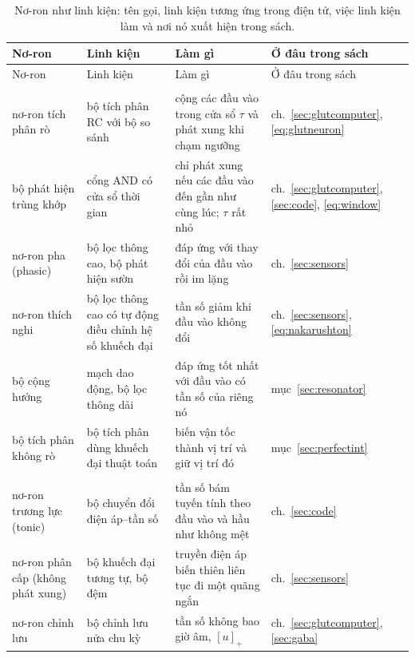 \begin{center}
\footnotesize
\setlength{\tabcolsep}{3pt}
\renewcommand{\arraystretch}{1.15}
\begin{longtable}{>{\raggedright}p{3.1cm}>{\raggedright}p{3.3cm}>{\raggedright}p{4.7cm}>{\raggedright\arraybackslash}p{2.4cm}}
\caption{Nơ-ron như linh kiện: tên gọi, linh kiện tương ứng trong điện tử, việc linh kiện làm và nơi nó xuất hiện trong sách.}\label{tab:eetypes}\\
\toprule
Nơ-ron & Linh kiện & Làm gì & Ở đâu trong sách \\
\midrule
\endfirsthead
\toprule
Nơ-ron & Linh kiện & Làm gì & Ở đâu trong sách \\
\midrule
\endhead
\bottomrule
\endfoot
\multicolumn{4}{l}{\emph{Bộ lọc và bộ tích phân}} \\
nơ-ron tích phân rò & bộ tích phân RC với bộ so sánh & cộng các đầu vào trong cửa sổ $\tau$ và phát xung khi chạm ngưỡng & ch.~\ref{sec:glutcomputer}, \eqref{eq:glutneuron} \\
bộ phát hiện trùng khớp & cổng AND có cửa sổ thời gian & chỉ phát xung nếu các đầu vào đến gần như cùng lúc; $\tau$ rất nhỏ & ch.~\ref{sec:glutcomputer}, \ref{sec:code}, \eqref{eq:window} \\
nơ-ron pha (phasic) & bộ lọc thông cao, bộ phát hiện sườn & đáp ứng với thay đổi của đầu vào rồi im lặng & ch.~\ref{sec:sensors} \\
nơ-ron thích nghi & bộ lọc thông cao có tự động điều chỉnh hệ số khuếch đại & tần số giảm khi đầu vào không đổi & ch.~\ref{sec:sensors}, \eqref{eq:nakarushton} \\
bộ cộng hưởng & mạch dao động, bộ lọc thông dải & đáp ứng tốt nhất với đầu vào có tần số của riêng nó & mục~\ref{sec:resonator} \\
bộ tích phân không rò & bộ tích phân dùng khuếch đại thuật toán & biến vận tốc thành vị trí và giữ vị trí đó & mục~\ref{sec:perfectint} \\
\midrule
\multicolumn{4}{l}{\emph{Bộ chuyển đổi}} \\
nơ-ron trương lực (tonic) & bộ chuyển đổi điện áp--tần số & tần số bám tuyến tính theo đầu vào và hầu như không mệt & ch.~\ref{sec:code} \\
nơ-ron phân cấp (không phát xung) & bộ khuếch đại tương tự, bộ đệm & truyền điện áp biến thiên liên tục đi một quãng ngắn & ch.~\ref{sec:sensors} \\
nơ-ron chỉnh lưu & bộ chỉnh lưu nửa chu kỳ & tần số không bao giờ âm, $[u]_+$ & ch.~\ref{sec:glutcomputer}, \ref{sec:gaba} \\

\end{longtable}
\end{center}
